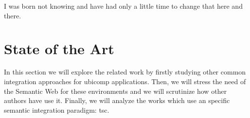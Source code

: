 
\begin{savequote}[50mm]
I was born not knowing and have had only a little time to change that here and there.
\end{savequote}


\chapter{State of the Art}
\label{cha:stateoftheart}
\newcommand{\pathchaptwo}{2_state_of_the_art}

\ifpdf
    \graphicspath{{\pathchaptwo/figures/PNG/}{\pathchaptwo/figures/PDF/}{\pathchaptwo/figures/}}
\else
    \graphicspath{{\pathchaptwo/figures/EPS/}{\pathchaptwo/figures/}}
\fi




In this section we will explore the related work by firstly studying other common integration approaches for \ac{ubicomp} applications.
Then, we will stress the need of the Semantic Web for these environments and we will scrutinize how other authors have use it.
Finally, we will analyze the works which use an specific semantic integration paradigm: \acl{tsc}.











